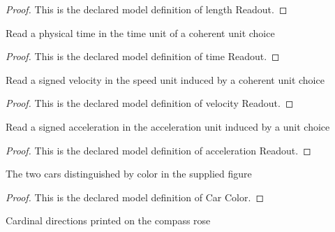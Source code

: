 \begin{proof}
  This is the declared model definition of length Readout.
\end{proof}
\begin{definition}
  \label{def:physics:phyx-mini-0674:phyxminiproblems-problemphyxmini0674-timereadout}
  Read a physical time in the time unit of a coherent unit choice
\end{definition}
\begin{proof}
  This is the declared model definition of time Readout.
\end{proof}
\begin{definition}
  \label{def:physics:phyx-mini-0674:phyxminiproblems-problemphyxmini0674-velocityreadout}
  Read a signed velocity in the speed unit induced by a coherent unit choice
\end{definition}
\begin{proof}
  This is the declared model definition of velocity Readout.
\end{proof}
\begin{definition}
  \label{def:physics:phyx-mini-0674:phyxminiproblems-problemphyxmini0674-accelerationreadout}
  Read a signed acceleration in the acceleration unit induced by a unit choice
\end{definition}
\begin{proof}
  This is the declared model definition of acceleration Readout.
\end{proof}
\begin{definition}
  \label{def:physics:phyx-mini-0674:phyxminiproblems-problemphyxmini0674-carcolor}
  The two cars distinguished by color in the supplied figure
\end{definition}
\begin{proof}
  This is the declared model definition of Car Color.
\end{proof}
\begin{definition}
  \label{def:physics:phyx-mini-0674:phyxminiproblems-problemphyxmini0674-cardinaldirection}
  Cardinal directions printed on the compass rose
\end{definition}
